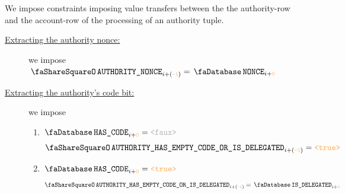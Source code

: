 \begin{center}
\end{center}
We impose constraints imposing value transfers between the the authority-row
and the account-row of the processing of an authority tuple.
\begin{description}
	\item[\underline{Extracting the authority nonce:}]
		we impose $\authAuthorityNonce _{i + \roffAuthorizationProcessingAuthorityRow} = \accNonce _{i + \roffAuthorizationProcessingAccountRow}$
	\item[\underline{Extracting the authority's code bit:}]
		we impose
		\begin{enumerate}
		        \item \If $\accHasCode _{i + \roffAuthorizationProcessingAccountRow} = \false $ \Then
				\[
					\authAuthorityHasEmptyCodeOrIsDelegated _{i + \roffAuthorizationProcessingAuthorityRow} = \true
				\]
		        \item \If $\accHasCode _{i + \roffAuthorizationProcessingAccountRow} = \true$ \Then
				\[
					\authAuthorityHasEmptyCodeOrIsDelegated _{i + \roffAuthorizationProcessingAuthorityRow} = \accIsDelegated _{i + \roffAuthorizationProcessingAccountRow}
				\]
		\end{enumerate}
\end{description}
